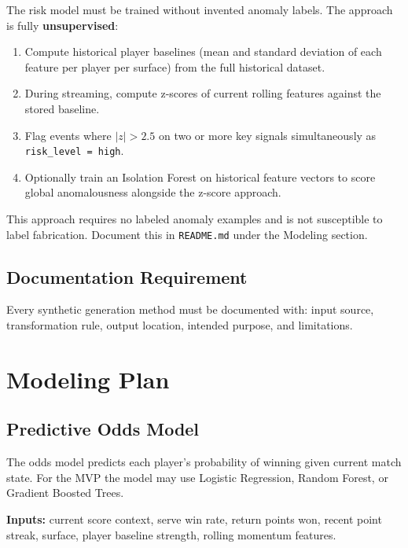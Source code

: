 \documentclass[11pt,a4paper]{article}
\begin{document}
\begin{importantbox}
The risk model must be trained without invented anomaly labels. The approach is fully
\textbf{unsupervised}:
\begin{enumerate}[nosep]
  \item Compute historical player baselines (mean and standard deviation of each feature
    per player per surface) from the full historical dataset.
  \item During streaming, compute z-scores of current rolling features against the stored
    baseline.
  \item Flag events where $|z| > 2.5$ on two or more key signals simultaneously as
    \texttt{risk\_level = high}.
  \item Optionally train an Isolation Forest on historical feature vectors to score
    global anomalousness alongside the z-score approach.
\end{enumerate}
This approach requires no labeled anomaly examples and is not susceptible to label fabrication.
Document this in \texttt{README.md} under the Modeling section.
\end{importantbox}

\subsection{Documentation Requirement}

Every synthetic generation method must be documented with: input source, transformation rule,
output location, intended purpose, and limitations.

\section{Modeling Plan}

\subsection{Predictive Odds Model}

The odds model predicts each player's probability of winning given current match state. For the
MVP the model may use Logistic Regression, Random Forest, or Gradient Boosted Trees.

\textbf{Inputs:} current score context, serve win rate, return points won, recent point streak,
surface, player baseline strength, rolling momentum features.
\end{document}
